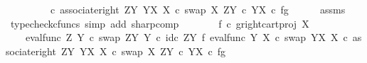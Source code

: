 \begin{isabellebody}
\ \ \ \ \ \ \ \ \ {\isasymcirc}\isactrlsub c\ associate{\isacharunderscore}{\kern0pt}right\ {\isacharparenleft}{\kern0pt}Z\isactrlbsup Y\isactrlesup {\isacharparenright}{\kern0pt}\ {\isacharparenleft}{\kern0pt}Y\isactrlbsup X\isactrlesup {\isacharparenright}{\kern0pt}\ X\ {\isasymcirc}\isactrlsub c\ swap\ X\ {\isacharparenleft}{\kern0pt}Z\isactrlbsup Y\isactrlesup \ {\isasymtimes}\isactrlsub c\ Y\isactrlbsup X\isactrlesup {\isacharparenright}{\kern0pt}{\isacharparenright}{\kern0pt}\isactrlsup {\isasymsharp}\ {\isasymcirc}\isactrlsub c\ {\isasymlangle}f{\isacharcomma}{\kern0pt}g{\isasymrangle}{\isachardoublequoteclose}\isanewline
\ \ \ \ \isamarkupfalse%
\ assms\ \isamarkupfalse%
\ {\isacharparenleft}{\kern0pt}typecheck{\isacharunderscore}{\kern0pt}cfuncs{\isacharcomma}{\kern0pt}\ simp\ add{\isacharcolon}{\kern0pt}\ sharp{\isacharunderscore}{\kern0pt}comp{\isacharparenright}{\kern0pt}\ \ \isanewline
\ \ \isamarkupfalse%
\ \isamarkupfalse%
\ {\isachardoublequoteopen}{\isacharparenleft}{\kern0pt}f\isactrlsup {\isasymflat}\ {\isasymcirc}\isactrlsub c\ {\isasymlangle}g\isactrlsup {\isasymflat}{\isacharcomma}{\kern0pt}right{\isacharunderscore}{\kern0pt}cart{\isacharunderscore}{\kern0pt}proj\ X\ {\isasymone}{\isasymrangle}{\isacharparenright}{\kern0pt}\isactrlsup {\isasymsharp}\ {\isacharequal}{\kern0pt}\isanewline
\ \ \ \ {\isacharparenleft}{\kern0pt}eval{\isacharunderscore}{\kern0pt}func\ Z\ Y\ {\isasymcirc}\isactrlsub c\ swap\ {\isacharparenleft}{\kern0pt}Z\isactrlbsup Y\isactrlesup {\isacharparenright}{\kern0pt}\ Y\ {\isasymcirc}\isactrlsub c\ {\isacharparenleft}{\kern0pt}id\isactrlsub c\ {\isacharparenleft}{\kern0pt}Z\isactrlbsup Y\isactrlesup {\isacharparenright}{\kern0pt}\ {\isasymtimes}\isactrlsub f\ eval{\isacharunderscore}{\kern0pt}func\ Y\ X\ {\isasymcirc}\isactrlsub c\ swap\ {\isacharparenleft}{\kern0pt}Y\isactrlbsup X\isactrlesup {\isacharparenright}{\kern0pt}\ X{\isacharparenright}{\kern0pt}\ {\isasymcirc}\isactrlsub c\ associate{\isacharunderscore}{\kern0pt}right\ {\isacharparenleft}{\kern0pt}Z\isactrlbsup Y\isactrlesup {\isacharparenright}{\kern0pt}\ {\isacharparenleft}{\kern0pt}Y\isactrlbsup X\isactrlesup {\isacharparenright}{\kern0pt}\ X\ {\isasymcirc}\isactrlsub c\ swap\ X\ {\isacharparenleft}{\kern0pt}Z\isactrlbsup Y\isactrlesup \ {\isasymtimes}\isactrlsub c\ Y\isactrlbsup X\isactrlesup {\isacharparenright}{\kern0pt}{\isacharparenright}{\kern0pt}\isactrlsup {\isasymsharp}\ {\isasymcirc}\isactrlsub c\ {\isasymlangle}f{\isacharcomma}{\kern0pt}g{\isasymrangle}{\isachardoublequoteclose}\isanewline

\end{isabellebody}
